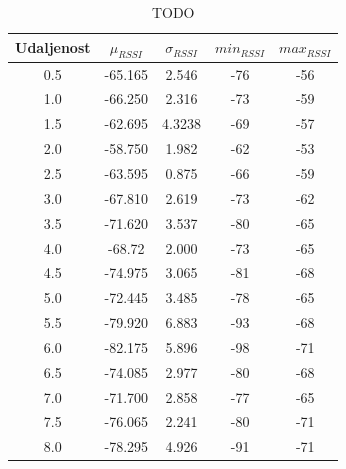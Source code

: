 
\begin{table}
	\centering
	\caption{TODO}
	\label{tbl:indoorKontaktMaxTx}
	\begin{tabular}{ccccc}
	\hline 
	Udaljenost & $\mu_{RSSI}$ & $\sigma_{RSSI}$ & $min_{RSSI}$ & $max_{RSSI}$ \\ 
	\hline 
	0.5 & -65.165 & 2.546 & -76 & -56 \\
	1.0 & -66.250 & 2.316 & -73 & -59 \\
	1.5 & -62.695 & 4.3238 & -69 & -57 \\
	2.0 & -58.750 & 1.982 & -62 & -53 \\
	2.5 & -63.595 & 0.875 & -66 & -59 \\
	3.0 & -67.810 & 2.619 & -73 & -62 \\
	3.5 & -71.620 & 3.537 & -80 & -65 \\
	4.0 & -68.72 & 2.000 & -73 & -65 \\
	4.5 & -74.975 & 3.065 & -81 & -68 \\
	5.0 & -72.445 & 3.485 & -78 & -65 \\
	5.5 & -79.920 & 6.883 & -93 & -68 \\
	6.0 & -82.175 & 5.896 & -98 & -71 \\
	6.5 & -74.085 & 2.977 & -80 & -68 \\
	7.0 & -71.700 & 2.858 & -77 & -65 \\
	7.5 & -76.065 & 2.241 & -80 & -71 \\
	8.0 & -78.295 & 4.926 & -91 & -71 \\
	\hline
	\end{tabular}
\end{table}


